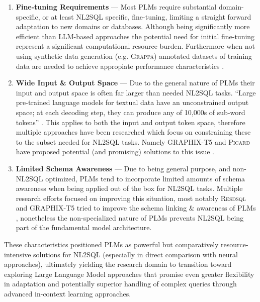 \documentclass{article}
\begin{document}
\begin{enumerate}

    \item \textbf{Fine-tuning Requirements} — Most PLMs require substantial domain-specific, or at least NL2SQL specific,
          fine-tuning, limiting a straight forward adaptation to new domains or databases. Although being significantly
          more efficient than LLM-based approaches the potential need for initial fine-tuning represent a significant
          computational resource burden. Furthermore when not using synthetic data generation (e.g. \textsc{Grappa})
          annotated datasets of training data are needed to achieve appropiate performance characteristics \citep{GRAPPA}.
    \item \textbf{Wide Input \& Output Space} — Due to the general nature of PLMs their input and output space is often
          far larger than needed 
          NL2SQL tasks. ``Large pre-trained language models for textual data have an unconstrained output space; at each
          decoding step, they can produce any of 10,000s of sub-word tokens'' \citep{PICARD}. This applies to both the
          input and output token space, therefore multiple approaches have been researched which focus on constraining
          these to the subset needed for NL2SQL tasks. Namely GRAPHIX-T5 and \textsc{Picard} have proposed potential
          (and promising) solutions to this issue \citep{GRAPHIX, PICARD}.
    \item \textbf{Limited Schema Awareness} — Due to being general purpose, and non-NL2SQL optimized, PLMs tend to
          incorporate limited amounts of schema awareness when being applied out of the box for NL2SQL tasks. Multiple
          research efforts focused on improving this situation, most notably \textsc{Resdsql} and GRAPHIX-T5 tried to
          improve the schema linking \& awareness of PLMs \citep{RESDSQL, GRAPHIX}, nonetheless the non-specialized nature
          of PLMs prevents NL2SQL being part of the fundamental model architecture.
\end{enumerate}

These characteristics positioned PLMs as powerful but comparatively resource-intensive solutions for NL2SQL (especially
in direct comparison with neural approaches), ultimately yielding the research domain to transition toward exploring
Large Language Model approaches that promise even greater flexibility in adaptation and potentially superior handling
of complex queries through advanced in-context learning approaches.
\end{document}
